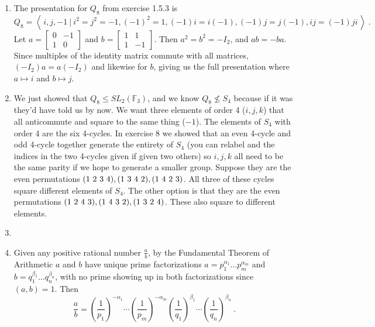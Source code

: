\documentclass[]{article}
\newcommand{\bbf}{\mathbb{F}}
\newcommand*{\cycle}[1]{( \foreach \entry [count=\i] in {#1} {\ifnum\i>1\ \fi\entry})}
\begin{document}
\begin{enumerate}
\item The presentation for $Q_8$ from exercise 1.5.3 is
\begin{equation}
Q_8 = \left\langle\, i,j,-1 \ \vert\ i^2=j^2=-1, (-1)^2=1, (-1)i=i(-1), (-1)j=j(-1), ij=(-1)ji\, \right\rangle\ .
\end{equation}
Let $a = \begin{bmatrix}0&-1\\1&0\end{bmatrix}$ and $b = \begin{bmatrix}1&1\\1&-1\end{bmatrix}$. Then $a^2 = b^2 = -I_2$, and $ab = -ba$. Since multiples of the identity matrix commute with all matrices, $(-I_2)a = a(-I_2)$ and likewise for $b$, giving us the full presentation where $a \mapsto i$ and $b \mapsto j$.


\item We just showed that $Q_8 \leq SL_2(\bbf_3)$, and we know $Q_8 \nleq S_4$ because if it was they'd have told us by now. We want three elements of order 4 ($i,j,k$) that all anticommute and square to the same thing ($-1$). The elements of $S_4$ with order 4 are the six 4-cycles. In exercise 8 we showed that an even 4-cycle and odd 4-cycle together generate the entirety of $S_4$ (you can relabel and the indices in the two 4-cycles given if given two others) so $i,j,k$ all need to be the same parity if we hope to generate a smaller group. Suppose they are the even permutations $\cycle{1,2,3,4}, \cycle{1,3,4,2}, \cycle{1,4,2,3}$. All three of these cycles square different elements of $S_4$. The other option is that they are the even permutations $\cycle{1,2,4,3}, \cycle{1,4,3,2}, \cycle{1,3,2,4}$. These also square to different elements.


\item 


\item Given any positive rational number $\frac{a}{b}$, by the Fundamental Theorem of Arithmetic $a$ and $b$ have unique prime factorizations $a = p_1^{\alpha_1}\ldots p_m^{\alpha_m}$ and $b = q_1^{\beta_1}\ldots q_n^{\beta_n}$, with no prime showing up in both factorizations since $(a,b) = 1$. Then 
\begin{equation}
\frac{a}{b} = \left(\frac{1}{p_1}\right)^{-\alpha_1}\cdots \left(\frac{1}{p_m}\right)^{-\alpha_m} \left(\frac{1}{q_1}\right)^{\beta_1}\cdots \left(\frac{1}{q_n}\right)^{\beta_n}\ .
\end{equation}



\end{enumerate}
\end{document}
